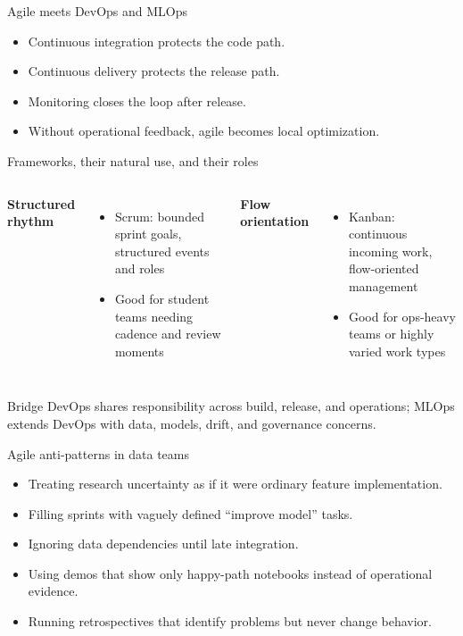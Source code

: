 \begin{frame}{Agile meets DevOps and MLOps}
\begin{itemize}
\item Continuous integration protects the code path.
\item Continuous delivery protects the release path.
\item Monitoring closes the loop after release.
\item Without operational feedback, agile becomes local optimization.
\end{itemize}
\coursefooter
\end{frame}

\begin{frame}{Frameworks, their natural use, and their roles}
\begin{columns}[T]
\textbf{Structured rhythm}
\begin{itemize}
\item Scrum: bounded sprint goals, structured events and roles
\item Good for student teams needing cadence and review moments
\end{itemize}
\textbf{Flow orientation}
\begin{itemize}
\item Kanban: continuous incoming work, flow-oriented management
\item Good for ops-heavy teams or highly varied work types
\end{itemize}
\end{columns}
\vspace{0.5em}
\begin{block}{Bridge}
DevOps shares responsibility across build, release, and operations; MLOps extends DevOps with data, models, drift, and governance concerns.
\end{block}
\coursefooter
\end{frame}

\begin{frame}{Agile anti-patterns in data teams}
\begin{itemize}
\item Treating research uncertainty as if it were ordinary feature implementation.
\item Filling sprints with vaguely defined ``improve model'' tasks.
\item Ignoring data dependencies until late integration.
\item Using demos that show only happy-path notebooks instead of operational evidence.
\item Running retrospectives that identify problems but never change behavior.
\end{itemize}
\coursefooter
\end{frame}

